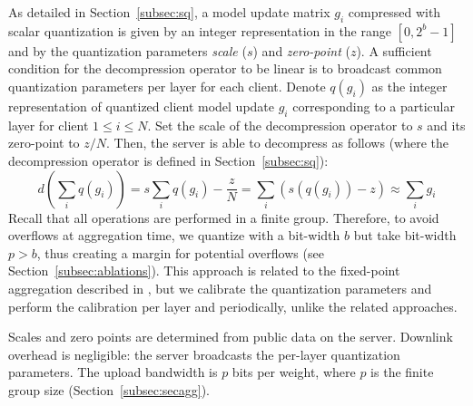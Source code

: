 As detailed in Section~\ref{subsec:sq}, a model update matrix $g_i$ compressed with scalar quantization is given by an integer representation in the range $[0, 2^{b}-1]$ and by the quantization parameters \emph{scale} ($s$) and \emph{zero-point} ($z$). A sufficient condition for the decompression operator to be linear is to broadcast common quantization parameters per layer for each client. Denote $q(g_i)$ as the integer representation of quantized client model update $g_i$ corresponding to a particular layer for client $1\leq i \leq N$.
Set the scale of the decompression operator to $s$ and its zero-point to $z/N$. 
Then, the server is able to decompress as follows (where the decompression operator is defined in Section~\ref{subsec:sq}):
\begin{equation*}\textstyle
    d\left(\sum_i q(g_i)\right) = s\sum_i  q(g_i) -  \frac{z}{N}  = \sum_i \left( s(q(g_i)) - z \right) \approx \sum_i g_i
\end{equation*}
Recall that all operations are performed in a finite group. Therefore, to avoid overflows at aggregation time, we quantize with a bit-width $b$ but take \SecAgg bit-width $p > b$, thus creating a margin for potential overflows (see Section~\ref{subsec:ablations}).
%
This approach is related to the fixed-point aggregation described in \citep{bonavitz2019federated,huba2021papaya}, but we calibrate the quantization parameters and perform the calibration per layer and periodically, unlike the related approaches.

 Scales and zero points are determined from public data on the server. Downlink overhead is negligible: the server broadcasts the per-layer quantization parameters. The upload bandwidth is $p$ bits per weight, where $p$ is the \SecAgg finite group size (Section~\ref{subsec:secagg}).    

